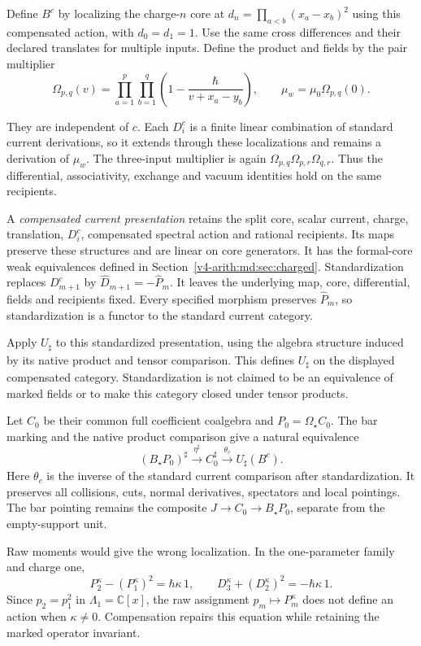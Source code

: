 Define $B^c$ by localizing the charge-$n$ core at
$d_n=\prod_{a<b}(x_a-x_b)^2$ using this
compensated action, with $d_0=d_1=1$.
Use the same cross differences and their
declared translates for multiple inputs.
Define the product and fields by the pair
multiplier
\[
 \Omega_{p,q}(v)
  =\prod_{a=1}^p\prod_{b=1}^q
       \left(1-\frac{\hbar}{v+x_a-y_b}\right),
 \qquad \mu_w=\mu_0\Omega_{p,q}(0).
\]

They are independent of $c$.
Each $D_i^c$ is a finite linear combination
of standard current derivations, so it
extends through these localizations and
remains a derivation of $\mu_w$.
The three-input multiplier is again
$\Omega_{p,q}\Omega_{p,r}\Omega_{q,r}$.
Thus the differential, associativity,
exchange and vacuum identities hold on
the same recipients.

A \emph{compensated current presentation}
retains the split core, scalar current,
charge, translation, $D_i^c$, compensated
spectral action and rational recipients.
Its maps preserve these structures and
are linear on core generators.
It has the formal-core weak equivalences
defined in Section~\ref{v4-arith:md:sec:charged}.
Standardization replaces $D_{m+1}^c$ by
$\widehat D_{m+1}=-\widehat P_m$.
It leaves the underlying map, core,
differential, fields and recipients fixed.
Every specified morphism preserves
$\widehat P_m$, so standardization is a
functor to the standard current category.

Apply $U_\sharp$ to this standardized
presentation, using the algebra structure
induced by its native product and tensor
comparison. This defines $U_\sharp$ on
the displayed compensated category.
Standardization is not claimed to be
an equivalence of marked fields or to
make this category closed under tensor
products.

Let $C_0$ be their common full coefficient
coalgebra and $P_0=\Omega_\star C_0$.
The bar marking and the native product
comparison give a natural equivalence
\begin{equation}\label{v4-arith:md:eq:compensated-comparison}
 (B_\star P_0)^\sharp
  \xrightarrow{\eta^\sharp}C_0^\sharp
  \xrightarrow{\theta_c}U_\sharp(B^c).
\end{equation}
Here $\theta_c$ is the inverse of the
standard current comparison after
standardization. It preserves all
collisions, cuts, normal derivatives,
spectators and local pointings.
The bar pointing remains the composite
$J\to C_0\to B_\star P_0$, separate from
the empty-support unit.

Raw moments would give the wrong
localization. In the one-parameter
family and charge one,
\[
 P_2^\kappa-(P_1^\kappa)^2
       =\hbar\kappa\,1,\qquad
 D_3^\kappa+(D_2^\kappa)^2
       =-\hbar\kappa\,1.
\]
Since $p_2=p_1^2$ in $\Lambda_1=\mathbb C[x]$,
the raw assignment $p_m\mapsto P_m^\kappa$
does not define an action when $\kappa\ne0$.
Compensation repairs this equation while
retaining the marked operator invariant.

